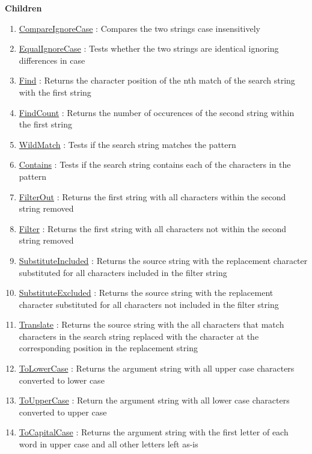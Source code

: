 \textbf{Children}
\begin{enumerate}
\item \hyperlink{ecldoc:str.compareignorecase}{CompareIgnoreCase}
: Compares the two strings case insensitively
\item \hyperlink{ecldoc:str.equalignorecase}{EqualIgnoreCase}
: Tests whether the two strings are identical ignoring differences in case
\item \hyperlink{ecldoc:str.find}{Find}
: Returns the character position of the nth match of the search string with the first string
\item \hyperlink{ecldoc:str.findcount}{FindCount}
: Returns the number of occurences of the second string within the first string
\item \hyperlink{ecldoc:str.wildmatch}{WildMatch}
: Tests if the search string matches the pattern
\item \hyperlink{ecldoc:str.contains}{Contains}
: Tests if the search string contains each of the characters in the pattern
\item \hyperlink{ecldoc:str.filterout}{FilterOut}
: Returns the first string with all characters within the second string removed
\item \hyperlink{ecldoc:str.filter}{Filter}
: Returns the first string with all characters not within the second string removed
\item \hyperlink{ecldoc:str.substituteincluded}{SubstituteIncluded}
: Returns the source string with the replacement character substituted for all characters included in the filter string
\item \hyperlink{ecldoc:str.substituteexcluded}{SubstituteExcluded}
: Returns the source string with the replacement character substituted for all characters not included in the filter string
\item \hyperlink{ecldoc:str.translate}{Translate}
: Returns the source string with the all characters that match characters in the search string replaced with the character at the corresponding position in the replacement string
\item \hyperlink{ecldoc:str.tolowercase}{ToLowerCase}
: Returns the argument string with all upper case characters converted to lower case
\item \hyperlink{ecldoc:str.touppercase}{ToUpperCase}
: Return the argument string with all lower case characters converted to upper case
\item \hyperlink{ecldoc:str.tocapitalcase}{ToCapitalCase}
: Returns the argument string with the first letter of each word in upper case and all other letters left as-is

\end{enumerate}
